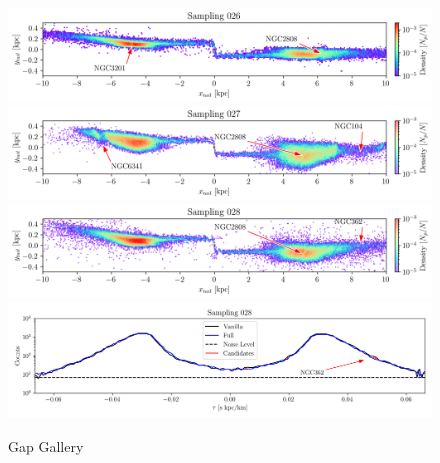\documentclass[draft]{aa}
\begin{document}
\begin{appendix}
    \begin{figure}
      \centering
      \includegraphics[width=\linewidth]{gallery_of_gaps_monte-carlo-026.png}
      \includegraphics[width=\linewidth]{gallery_of_gaps_monte-carlo-027.png}
      \includegraphics[width=\linewidth]{gallery_of_gaps_monte-carlo-028.png}
      \includegraphics[width=\linewidth]{tau-profile-monte-carlo-028.png}
      \caption{Gap Gallery}
      \label{fig:gallery6}
      \end{figure}        


\end{appendix}
\end{document}
